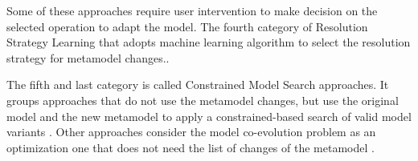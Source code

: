  
  Some of these approaches require user intervention to make decision on the selected operation to adapt the model.
  The fourth category of Resolution Strategy Learning that adopts machine learning algorithm to select the resolution strategy for metamodel changes.\cite{anguel2013towards}.%
 
The fifth and last category is called Constrained Model Search approaches. It groups approaches that do not use the metamodel changes, but use the original model and the new metamodel to apply a constrained-based search of valid model variants \cite{demuth2016co,gomez2014approach,schonbock2014care}. Other approaches consider the model co-evolution problem as an optimization one that does not need the list of changes of the metamodel \cite{kessentini2016automated,kessentini2019automated,kessentini2020interactive}.




